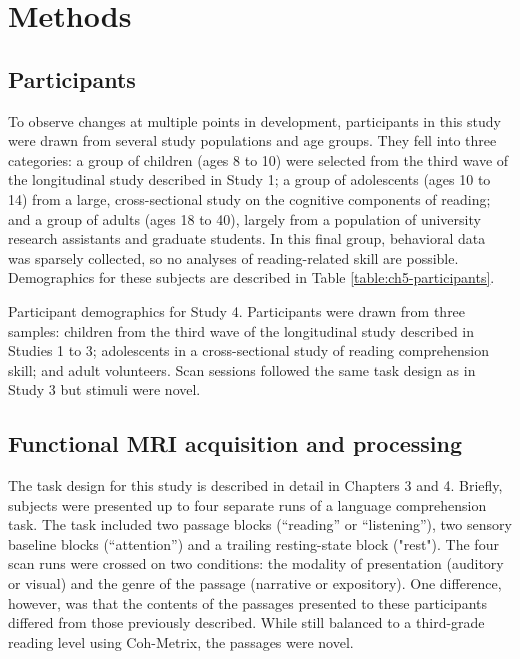 \section{Methods}

\subsection{Participants}

To observe changes at multiple points in development, participants in this study were drawn from several study populations and age groups. They fell into three categories: a group of children (ages 8 to 10) were selected from the third wave of the longitudinal study described in Study 1;  a group of adolescents (ages 10 to 14) from a large, cross-sectional study on the cognitive components of reading; and a group of adults (ages 18 to 40), largely from a population of university research assistants and graduate students. In this final group, behavioral data was sparsely collected, so no analyses of reading-related skill are possible. Demographics for these subjects are described in Table \ref{table:ch5-participants}.

\begin{table}[t]
	\renewcommand{\tabcolsep}{0.09cm}
	\centering
	
	\caption[Participant demographics for Study 4]{Participant demographics for Study 4. Participants were drawn from three samples: children from the third wave of the longitudinal study described in Studies 1 to 3; adolescents in a cross-sectional study of reading comprehension skill; and adult volunteers. Scan sessions followed the same task design as in Study 3 but stimuli were novel.}
	\label{table:ch5-participants}
\end{table}

\subsection{Functional MRI acquisition and processing}

The task design for this study is described in detail in Chapters 3 and 4. Briefly, subjects were presented up to four separate runs of a language comprehension task. The task included two passage blocks (``reading'' or ``listening''), two sensory baseline blocks (``attention'') and a trailing resting-state block ("rest"). The four scan runs were crossed on two conditions: the modality of presentation (auditory or visual) and the genre of the passage (narrative or expository). One difference, however, was that the contents of the passages presented to these participants differed from those previously described. While still balanced to a third-grade reading level using Coh-Metrix, the passages were novel. 

